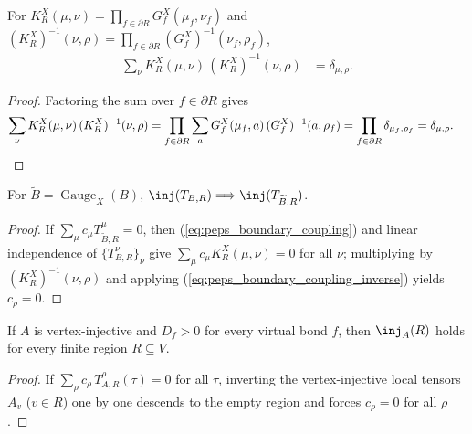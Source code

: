 \begin{lemma}
    \label{thm:peps_sum_regionBoundaryCoupling_mul_inv}
    \leanok
    For $K_R^X(\mu,\nu)=\prod_{f\in\partial R}G_f^X(\mu_f,\nu_f)$ and
    $(K_R^X)^{-1}(\nu,\rho)=\prod_{f\in\partial R}(G_f^X)^{-1}(\nu_f,\rho_f)$,
    \begin{align}
        \sum_{\nu}K_R^X(\mu,\nu)\,(K_R^X)^{-1}(\nu,\rho)
         & =
        \delta_{\mu,\rho}.
        \label{eq:peps_boundary_coupling_inverse}
    \end{align}
\end{lemma}
\begin{proof}\leanok
    Factoring the sum over $f\in\partial R$ gives
    \begin{align}
        \sum_{\nu}K_R^X(\mu,\nu)\,(K_R^X)^{-1}(\nu,\rho)
         & =
        \prod_{f\in\partial R}
        \sum_a G_f^X(\mu_f,a)\,(G_f^X)^{-1}(a,\rho_f)
        = \prod_{f\in\partial R}\delta_{\mu_f,\rho_f}
        = \delta_{\mu,\rho}.
        \notag
    \end{align}
\end{proof}

\begin{lemma}
    \label{thm:peps_regionBlockedTensorInjective_applyGauge}
    \leanok
    For $\widetilde B=\operatorname{Gauge}_X(B)$,
    $\inj(T_{B,R})\Longrightarrow\inj(T_{\widetilde B,R})$.
\end{lemma}
\begin{proof}\leanok
    If $\sum_\mu c_\mu T_{\widetilde B,R}^{\mu}=0$, then (\ref{eq:peps_boundary_coupling})
    and linear independence of $\{T_{B,R}^{\nu}\}_{\nu}$ give
    $\sum_{\mu}c_\mu K_R^X(\mu,\nu)=0$ for all $\nu$; multiplying by
    $(K_R^X)^{-1}(\nu,\rho)$ and applying (\ref{eq:peps_boundary_coupling_inverse})
    yields $c_\rho=0$.
\end{proof}

\begin{lemma}%
    \label{thm:peps_regionBlockedTensorInjective_of_isVertexInjective}
    \leanok
    If $A$ is vertex-injective and $D_f>0$ for every virtual bond $f$, then
    $\inj_A(R)$ holds for every finite region $R\subseteq V$.
\end{lemma}
\begin{proof}\leanok
    If $\sum_{\rho} c_\rho\,T_{A,R}^{\rho}(\tau)=0$ for all $\tau$, inverting
    the vertex-injective local tensors $A_v$ ($v\in R$) one by one descends to
    the empty region and forces $c_\rho=0$ for all $\rho$.
\end{proof}

